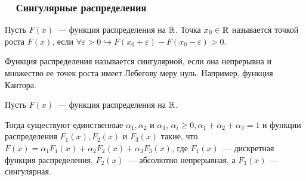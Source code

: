 \subsubsection*{~~Сингулярные распределения}
\begin{definition}
	Пусть $F(x)$~--- функция распределения на $\mathbb{R}$. Точка $x_0 \in \mathbb{R}$ называется точкой роста $F(x)$, если $\forall \varepsilon > 0 \hookrightarrow F(x_0 + \varepsilon) - F(x_0 - \varepsilon) > 0$.
\end{definition}

\begin{definition}
	Функция распределения называется сингулярной, если она непрерывна и множество ее точек роста имеет Лебегову меру нуль. Например, функция Кантора.
\end{definition}
\begin{theorem}
	Пусть $F(x)$~--- функция распределения на $\mathbb{R}$.
	
	Тогда существуют единственные $\alpha_1, \alpha_2$ и $\alpha_3$, $\alpha_i \geqslant 0, \alpha_1 + \alpha_2 + \alpha_3 = 1$ и функции распределения $F_1(x), F_2(x)$ и $F_3(x)$ такие, что $F(x) = \alpha_1 F_1(x) + \alpha_2 F_2(x) + \alpha_3 F_3(x)$, где $F_1(x)$~--- дискретная функция распределения, $F_2(x)$~--- абсолютно непрерывная, а $F_3(x)$~--- сингулярная. 
\end{theorem}